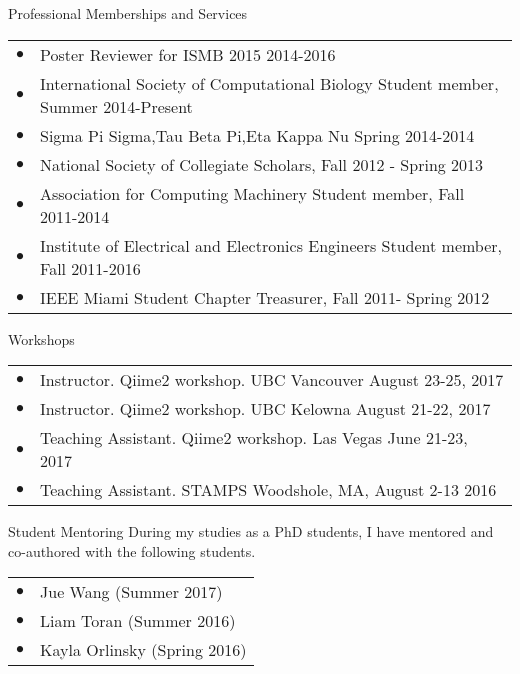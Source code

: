 \documentclass{resume} %
\begin{document}
\begin{rSection}{Professional Memberships and Services}
  \begin{tabular}{ll}
    $\bullet$ & Poster Reviewer for ISMB 2015  2014-2016\\
    $\bullet$ & International Society of Computational Biology Student member, Summer  2014-Present\\
    $\bullet$ & Sigma Pi Sigma,Tau Beta Pi,Eta Kappa Nu Spring 2014-2014 \\
    $\bullet$ & National Society of Collegiate Scholars, Fall 2012 - Spring 2013\\
    $\bullet$ & Association for Computing Machinery Student member, Fall  2011-2014 \\
    $\bullet$ & Institute of Electrical and Electronics Engineers Student member, Fall  2011-2016 \\
    $\bullet$ & IEEE Miami Student Chapter Treasurer, Fall 2011- Spring 2012\\
  \end{tabular}
\end{rSection}

\begin{rSection}{Workshops}
  \begin{tabular}{ll}
    $\bullet$ & Instructor. Qiime2 workshop. UBC Vancouver August 23-25, 2017 \\
    $\bullet$ & Instructor. Qiime2 workshop. UBC Kelowna August 21-22, 2017 \\
    $\bullet$ & Teaching Assistant. Qiime2 workshop.  Las Vegas June 21-23, 2017 \\
    $\bullet$ & Teaching Assistant. STAMPS
    Woodshole, MA, August 2-13 2016 \\
  \end{tabular}
\end{rSection}

\begin{rSection}{Student Mentoring}
  During my studies as a PhD students, I have mentored and co-authored with the following students.
  \begin{tabular}{ll}
    $\bullet$  &   Jue Wang (Summer 2017) \\
    $\bullet$  &   Liam Toran (Summer 2016)\\
    $\bullet$  &   Kayla Orlinsky (Spring 2016) \\
  \end{tabular}
\end{rSection}
\end{document}
